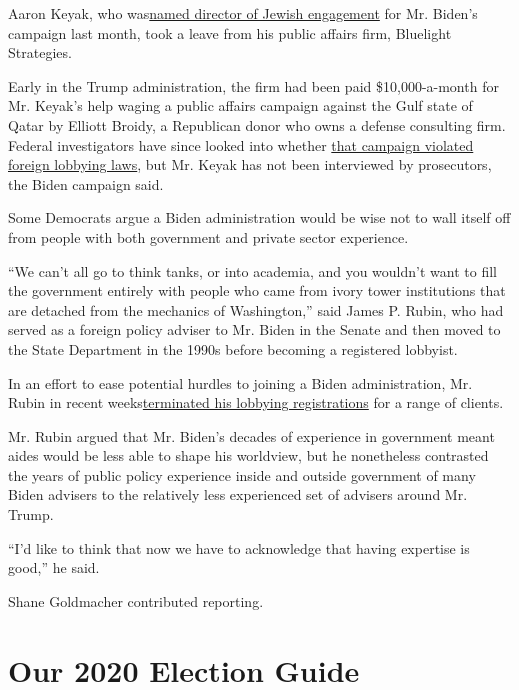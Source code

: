 Aaron Keyak, who
was\href{https://jewishinsider.com/2020/07/biden-campaign-taps-aaron-keyak-to-lead-jewish-outreach/}{named
director of Jewish engagement} for Mr. Biden's campaign last month, took
a leave from his public affairs firm, Bluelight Strategies.

Early in the Trump administration, the firm had been paid
\$10,000-a-month for Mr. Keyak's help waging a public affairs campaign
against the Gulf state of Qatar by Elliott Broidy, a Republican donor
who owns a defense consulting firm. Federal investigators have since
looked into whether
\href{https://www.nytimes.com/2019/08/13/us/politics/elliott-broidy-trump.html}{that
campaign violated foreign lobbying laws}, but Mr. Keyak has not been
interviewed by prosecutors, the Biden campaign said.

Some Democrats argue a Biden administration would be wise not to wall
itself off from people with both government and private sector
experience.

``We can't all go to think tanks, or into academia, and you wouldn't
want to fill the government entirely with people who came from ivory
tower institutions that are detached from the mechanics of Washington,''
said James P. Rubin, who had served as a foreign policy adviser to Mr.
Biden in the Senate and then moved to the State Department in the 1990s
before becoming a registered lobbyist.

In an effort to ease potential hurdles to joining a Biden
administration, Mr. Rubin in recent
weeks\href{https://efile.fara.gov/docs/6415-Short-Form-20200609-122.pdf}{terminated
his lobbying registrations} for a range of clients.

Mr. Rubin argued that Mr. Biden's decades of experience in government
meant aides would be less able to shape his worldview, but he
nonetheless contrasted the years of public policy experience inside and
outside government of many Biden advisers to the relatively less
experienced set of advisers around Mr. Trump.

``I'd like to think that now we have to acknowledge that having
expertise is good,'' he said.

Shane Goldmacher contributed reporting.

\hypertarget{our-2020-election-guide}{%
\section{Our 2020 Election Guide}\label{our-2020-election-guide}}


